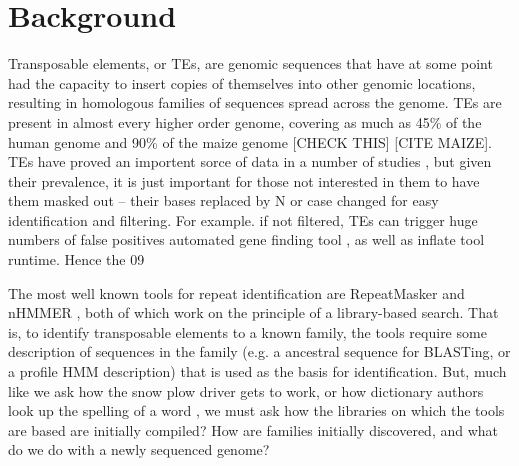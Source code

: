 \documentclass{bmcart}
\begin{document}

\newtheorem{definition}{Definition}
\newtheorem{observation}{Observation}
\newtheorem{lemma}{Lemma}
\newtheorem{theorem}{Theorem}

\section*{Background}
Transposable elements, or TEs, are genomic sequences that have at some
point had the capacity to insert copies of themselves into other
genomic locations, resulting in homologous families of sequences
spread across the genome.  TEs are present in almost every higher
order genome, covering as much as 45\% of the human genome and 90\% of
the maize genome [CHECK THIS] \cite{Venter:2001p92} [CITE MAIZE].  TEs have
proved an importent sorce of data in a number of studies \cite{Arndt:2005p279,Karro:2008p123,Mugal:2009p581,Hardison:2003p97}, but
given their prevalence, it is just important for those not interested
in them to have them masked out -- their bases replaced by N or case
changed for easy identification and filtering.  For example. if not
filtered, TEs can trigger huge numbers of false positives automated
gene finding tool \cite{Jiang:2013jt}, as well as inflate tool runtime.
Hence the 09

The most well known tools for repeat identification are RepeatMasker
and nHMMER \cite{RepeatMaskerOpen:XkNxXSd7,Wheeler:2013gj}, both of
which work on the principle of a library-based search.  That is, to
identify transposable elements to a known family, the tools require
some description of sequences in the family (e.g. a ancestral sequence
for BLASTing, or a profile HMM description) that is used as the basis
for identification.  But, much like we ask how the snow plow driver
gets to work, or how dictionary authors look up the spelling of a word
\cite{Pratchett:uw}, we must ask how the libraries on which the tools are based are
initially compiled?  How are families initially discovered, and what
do we do with a newly sequenced genome?
\end{document}
